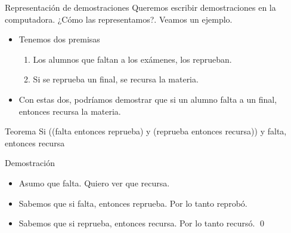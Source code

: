 \documentclass[xcolor={dvipsnames},spanish]{beamer}
\begin{document}
\begin{frame}{Representación de demostraciones}
    Queremos escribir demostraciones en la computadora. ¿Cómo las representamos?. Veamos un ejemplo.
    
    \begin{itemize}
        \item Tenemos dos premisas
        \begin{enumerate}
            \item Los alumnos que faltan a los exámenes, los reprueban.
            \item Si se reprueba un final, se recursa la materia.
        \end{enumerate}
        \item Con estas dos, podríamos demostrar que si un alumno falta a un final, entonces recursa la materia.
    \end{itemize}

    \begin{block}{Teorema}
        Si ((falta entonces reprueba) y (reprueba entonces recursa)) y falta, entonces recursa
    \end{block}
    \begin{exampleblock}{Demostración}
        \begin{itemize}
    \item Asumo que falta. Quiero ver que recursa.
    \item Sabemos que si falta, entonces reprueba. Por lo tanto reprobó.
    \item Sabemos que si reprueba, entonces recursa. Por lo tanto recursó. \qed
\end{itemize}
    \end{exampleblock}
\end{frame}
\end{document}
